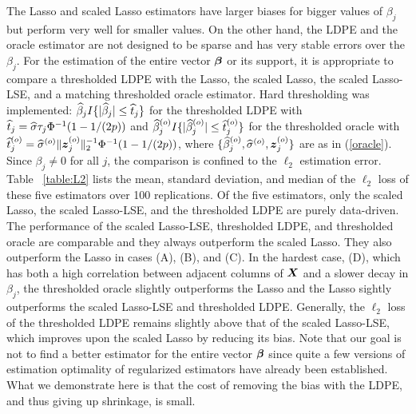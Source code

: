 \documentclass[11pt]{amsart}
\begin{document}
The Lasso and scaled Lasso estimators have larger biases for bigger values of $\beta_j$ 
but perform very well for smaller values. 
On the other hand, the LDPE and the oracle estimator are not designed to be sparse 
and has very stable errors over the $\beta_j$. 
For the estimation of the entire vector $\boldsymbol{\beta}$ or its support, it is appropriate to compare a thresholded 
LDPE with the Lasso, the scaled Lasso, the {scaled Lasso-LSE}, and a matching thresholded oracle estimator. 
Hard thresholding was implemented: 
$\widehat{\beta}_j I\{|\widehat{\beta}_j|\le \widehat{t}_j\}$ for the thresholded LDPE with $\widehat{t}_j = \widehat{\sigma}\tau_j\Phi^{-1}(1-1/(2p))$ 
and $\widehat{\beta}_j^{(o)} I\{|\widehat{\beta}_j^{(o)}|\le \widehat{t}_j^{(o)}\}$ for the thresholded oracle with 
$\widehat{t}_j^{(o)} = \widehat{\sigma}^{(o)}\|\boldsymbol{z}_j^{(o)}\|_2^{-1}\Phi^{-1}(1-1/(2p))$, where 
$\{\widehat{\beta}_j^{(o)},\widehat{\sigma}^{(o)},\boldsymbol{z}_j^{(o)}\}$ are as in (\ref{oracle}). 
Since $\beta_j\neq 0$ for all $j$, the comparison is confined to the $\ell_2$ estimation error. 
Table ~\ref{table:L2} lists the mean, standard deviation, and median of 
the $\ell_2$ loss of these five estimators over 100 replications.  
Of the five estimators, only the scaled Lasso, the {scaled Lasso-LSE}, and the thresholded LDPE are purely data-driven. 
The performance of the {scaled Lasso-LSE}, thresholded LDPE, and thresholded oracle are comparable 
and they always outperform the scaled Lasso. 
They also outperform the Lasso in cases (A), (B), and (C). 
In the hardest case, (D), which has both a high correlation between adjacent columns of $\boldsymbol{X}$ 
and a slower decay in $\beta_j$, the thresholded oracle slightly outperforms the Lasso and 
the Lasso sightly outperforms the {scaled Lasso-LSE} and thresholded LDPE.
Generally, the $\ell_2$ loss of the thresholded LDPE remains 
slightly above that of the {scaled Lasso-LSE}, which improves upon the scaled Lasso 
by reducing its bias. %
Note that our goal is not to find a better estimator for the entire vector $\boldsymbol{\beta}$ since 
quite a few versions of estimation optimality of regularized estimators have already been established. 
What we demonstrate here is that the cost of removing the bias with the LDPE, and thus giving up shrinkage, 
is small.
\end{document}
